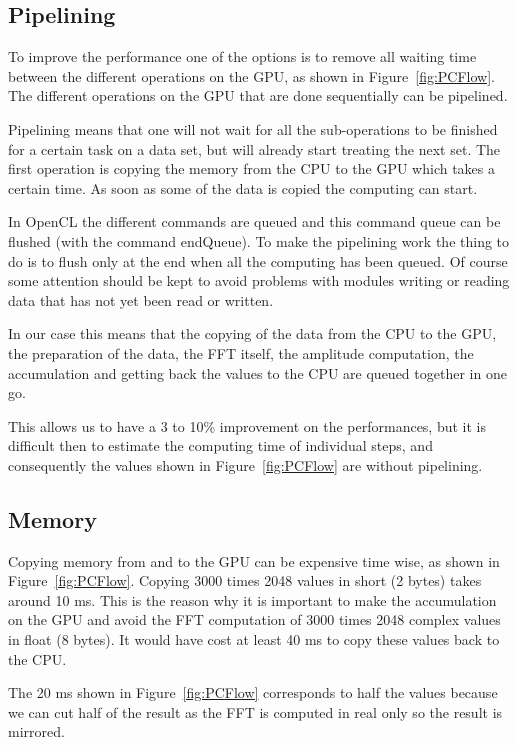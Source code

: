 \subsection{Pipelining}

To improve the performance one of the options is to remove all waiting time between the different operations on the \gls{GPU}, as shown in Figure~\ref{fig:PCFlow}. The different operations on the \gls{GPU} that are done sequentially can be pipelined.

Pipelining means that one will not wait for all the sub-operations to be finished for a certain task on a data set, but will already start treating the next set. The first operation is copying the memory from the \gls{CPU} to the \gls{GPU} which takes a certain time. As soon as some of the data is copied the computing can start.

In \gls{OpenCL} the different commands are queued and this command queue can be flushed (with the command endQueue). To make the pipelining work the thing to do is to flush only at the end when all the computing has been queued. Of course some attention should be kept to avoid problems with modules writing or reading data that has not yet been read or written.

In our case this means that the copying of the data from the \gls{CPU} to the \gls{GPU}, the preparation of the data, the \gls{FFT} itself, the amplitude computation, the accumulation and getting back the values to the \gls{CPU} are queued together in one go.

This allows us to have a 3 to 10\% improvement on the performances, but it is difficult then to estimate the computing time of individual steps, and consequently the values shown in Figure~\ref{fig:PCFlow} are without pipelining.

\subsection{Memory}

Copying memory from and to the \gls{GPU} can be expensive time wise, as shown in Figure~\ref{fig:PCFlow}. Copying 3000 times 2048 values in short (2 bytes) takes around 10 ms. This is the reason why it is important to make the accumulation on the \gls{GPU} and avoid the \gls{FFT} computation of 3000 times 2048 complex values in float (8 bytes). It would have cost at least 40 ms to copy these values back to the \gls{CPU}. 

The 20 ms shown in Figure~\ref{fig:PCFlow} corresponds to half the values because we can cut half of the result as the \gls{FFT} is computed in real only so the result is mirrored.

